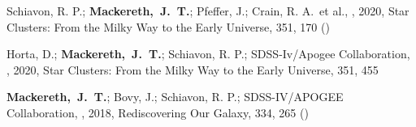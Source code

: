 \item[{\scriptsize3}]Schiavon, R. P.; \textbf{Mackereth,~J.~T.}; Pfeffer, J.; Crain, R. A.~et al., , 2020, Star Clusters: From the Milky Way to the Early Universe, {351}, 170 ()

\item[{\scriptsize2}]Horta, D.; \textbf{Mackereth,~J.~T.}; Schiavon, R. P.; SDSS-Iv/Apogee Collaboration, , 2020, Star Clusters: From the Milky Way to the Early Universe, {351}, 455

\item[{\scriptsize1}]\textbf{Mackereth,~J.~T.}; Bovy, J.; Schiavon, R. P.; SDSS-IV/APOGEE Collaboration, , 2018, Rediscovering Our Galaxy, {334}, 265 ()